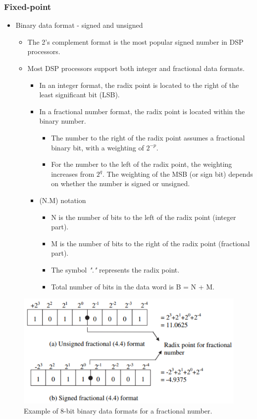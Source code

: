 \subsubsection{Fixed-point}

\begin{itemize}
	\item  Binary data format - signed and unsigned
	\begin{itemize}
		\item  The 2's complement format is	the most popular signed number in DSP processors.
		\item Most DSP processors support both integer and fractional data formats.
		\begin{itemize}
			\item  In an integer format, the radix point is located to the right of the least
			significant bit (LSB).
			\item In a fractional number format, the radix point is located within the binary number. 
			\begin{itemize}
				\item The number to the right	of the radix point assumes a fractional binary bit, with a weighting of $2^{-p}$.
				\item For the number to the left of the radix point, the weighting increases from $2^q$. The weighting of the MSB (or sign bit) depends on whether the number is signed or unsigned. 
			\end{itemize}
			\item (N.M) notation
			\begin{itemize}
				\item  N is the number of bits to the left of the radix point (integer part).
				\item M is the number of bits to the right of the radix point (fractional part). 
				\item The symbol \textit{"."} represents the radix point. 
				\item Total number of bits in the data word is B = N + M. 
			\end{itemize}
		\end{itemize}
	\end{itemize}
\end{itemize}

\begin{figure} [H]
	\centering
	\includegraphics[width=0.6\linewidth]{graphics/1.png}
	\caption{Example of 8-bit binary data formats for a fractional number.}
	\label{fig:1}
\end{figure}

